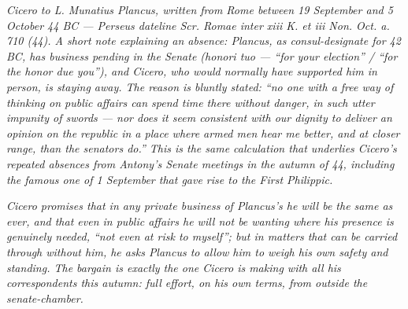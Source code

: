 
\textit{Cicero to L. Munatius Plancus, written from Rome
between 19 September and 5 October 44 BC --- Perseus
dateline \textit{Scr. Romae inter xiii K. et iii Non. Oct.
a. 710 (44)}. A short note explaining an absence: Plancus,
as consul-designate for 42 BC, has business pending in the
Senate (\textit{honori tuo} --- ``for your election'' /
``for the honor due you''), and Cicero, who would normally
have supported him in person, is staying away. The reason
is bluntly stated: ``no one with a free way of thinking on
public affairs can spend time there without danger, in
such utter impunity of swords --- nor does it seem
consistent with our dignity to deliver an opinion on the
republic in a place where armed men hear me better, and at
closer range, than the senators do.'' This is the same
calculation that underlies Cicero's repeated absences from
Antony's Senate meetings in the autumn of 44, including
the famous one of 1 September that gave rise to the
\textit{First Philippic}.}

\textit{Cicero promises that in any private business of
Plancus's he will be the same as ever, and that even in
public affairs he will not be wanting where his presence
is genuinely needed, ``not even at risk to myself''; but
in matters that can be carried through without him, he
asks Plancus to allow him to weigh his own safety and
standing. The bargain is exactly the one Cicero is making
with all his correspondents this autumn: full effort, on
his own terms, from outside the senate-chamber.}
